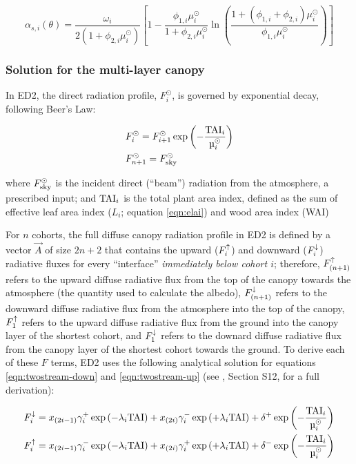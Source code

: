 \begin{equation}\label{eqn:ssa-solved}
  \alpha_{s,i}(\theta) = \frac{\omega_{i}}{2\left( 1 + \phi_{2,i} \mu^{\odot}_{i} \right)}
  \left[ 1 - \frac{\phi_{1,i}\mu^{\odot}_{i}}{1 + \phi_{2,i}\mu^{\odot}_{i}} \ln\left( \frac{1 + (\phi_{1,i} + \phi_{2,i})\mu^{\odot}_{i}} {\phi_{1,i}\mu^{\odot}_{i}} \right)  \right]
\end{equation}

\subsubsection{Solution for the multi-layer canopy}\label{subsubsec:multi-canopy-solution}

In ED2, the direct radiation profile, $F^{\odot}_{i}$, is governed by exponential decay, following Beer's Law:

\begin{align}
  & F^{\odot}_{i} = F^{\odot}_{i+1} \exp\left( -\frac{\TAI_{i}}{\mu^{\odot}_{i}} \right) \\
  & F^{\odot}_{n+1} = F^{\odot}_{\sky}
\end{align}

where $F^{\odot}_{\mathrm{sky}}$ is the incident direct (``beam'') radiation from the atmosphere, a prescribed input;
and $\mathrm{TAI}_{i}$ is the total plant area index, defined as the sum of effective leaf area index ($L_{i}$; equation \ref{eqn:elai}) and wood area index (WAI)

For $n$ cohorts, the full diffuse canopy radiation profile in ED2 is defined by a vector $\vec{A}$ of size $2n + 2$ that contains the upward ($F^{\uparrow}_{i}$) and downward ($F^{\downarrow}_{i}$) radiative fluxes for every ``interface'' \emph{immediately below cohort $i$}; therefore,
$F^{\uparrow}_{(n+1)}$ refers to the upward diffuse radiative flux from the top of the canopy towards the atmosphere (the quantity used to calculate the albedo),
$F^{\downarrow}_{(n+1)}$ refers to the downward diffuse radiative flux from the atmosphere into the top of the canopy,
$F^{\uparrow}_{1}$ refers to the upward diffuse radiative flux from the ground into the canopy layer of the shortest cohort,
and
$F^{\downarrow}_{1}$ refers to the downard diffuse radiative flux from the canopy layer of the shortest cohort towards the ground.
To derive each of these $F$ terms, ED2 uses the following analytical solution for equations \ref{eqn:twostream-down} and \ref{eqn:twostream-up} (see \citealt{longo2019ed2description}, Section S12, for a full derivation):

\begin{align}
  & F^{\down}_{i}
    = x_{(2i-1)}\gamma^{+}_{i}  \exp\left( -\lambda_{i} \TAI \right)
    + x_{(2i)}\gamma^{-}_{i}    \exp\left( +\lambda_{i} \TAI \right)
    + \delta^{+}               \exp\left( -\frac{\TAI_{i}}{\mu^{\odot}_{i}} \right) \label{eqn:edr-fdown} \\
  & F^{\up}_{i}
    = x_{(2i-1)}\gamma^{-}_{i}  \exp\left( -\lambda_{i} \TAI \right)
    + x_{(2i)}\gamma^{+}_{i}    \exp\left( +\lambda_{i} \TAI \right)
    + \delta^{-}               \exp\left( -\frac{\TAI_{i}}{\mu^{\odot}_{i}} \right) \label{eqn:edr-fup}
\end{align}

